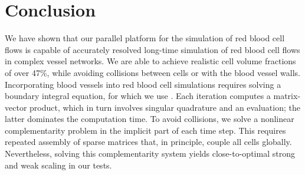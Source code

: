 \section{Conclusion\label{sec:conclusion}}
We have shown that our parallel platform for the simulation of red
blood cell flows is capable of accurately resolved long-time
simulation of red blood cell flows in complex vessel networks. We are
able to achieve realistic cell volume fractions of over 47\%, while avoiding
collisions between cells or with the blood vessel
walls. Incorporating blood vessels into red blood cell
simulations requires solving a
boundary integral equation, for which we use \gmres.
Each \gmres iteration computes a matrix-vector product,
which in turn involves singular quadrature and an \fmm
evaluation; the latter dominates the computation time. To avoid collisions,
we solve a nonlinear complementarity problem in the implicit part of
each time step. This requires repeated assembly of sparse matrices that, in
principle, couple all cells globally. Nevertheless, solving this
complementarity system yields close-to-optimal strong
and weak scaling in our tests. 

\iffalse
\section{Acknowledgements}
We would like to thank 
Dhairya Malhotra, 
Michael Shelley and 
Shenglong Wang
for support and various discussions throughout about various aspects of this work.
\fi
